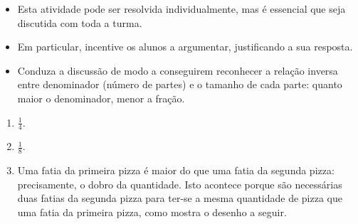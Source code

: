 \begin{multicols}{2}
\begin{objetivos}{}{}
\end{objetivos}

\begin{orientacoes}

\begin{itemize} %
    \item       Esta atividade pode ser resolvida individualmente, mas é essencial que seja discutida com toda a turma.
    \item       Em particular, incentive os alunos a argumentar, justificando a sua resposta.
    \item       Conduza a discussão de modo a conseguirem reconhecer a relação inversa entre denominador (número de partes) e o tamanho de cada parte: quanto maior o denominador, menor a fração.
\end{itemize} %


\end{orientacoes}

\begin{solucao}{}{}
\begin{enumerate} [\quad a)] %
    \item             $\frac{1}{4}$.
    \item             $\frac{1}{8}$.
    \item       Uma fatia da primeira pizza é maior do que uma fatia da segunda pizza: precisamente, o dobro da quantidade. Isto acontece porque são necessárias duas fatias da segunda pizza para ter-se a mesma quantidade de pizza que uma fatia da primeira pizza, como mostra o desenho a seguir.
\end{enumerate} %
\begin{center}
        \quad \quad
\end{center}
\end{solucao}






\end{multicols}
